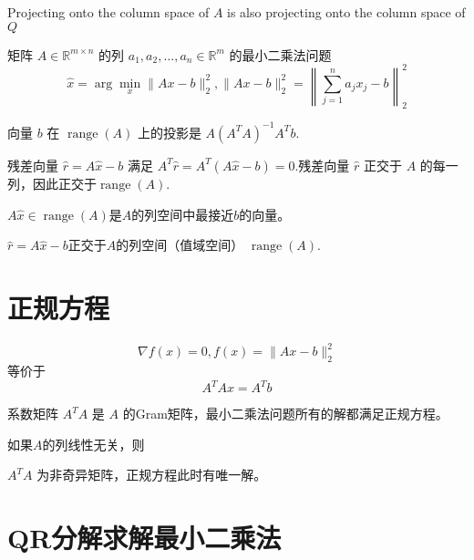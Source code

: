 \begin{FigureCenter}{Projecting onto the column space of $A$ is also projecting onto the column space of $Q$}
    
\end{FigureCenter}

矩阵 $ {A} \in \mathbb{R}^{m \times n} $ 的列 $ a_{1}, a_{2}, \ldots, a_{n} \in \mathbb{R}^{m} $ 的最小二乘法问题
\begin{equation}
\hat{x}=\arg \underset{x}{\min}\|A x-b\|_{2}^{2} ,\|A x-b\|_{2}^{2}=\left\|\sum_{j=1}^{n} a_{j} x_{j}-b\right\|_{2}^{2}
\end{equation}

向量 $ b $ 在 $ \operatorname{range}(A) $ 上的投影是 $ A\left(A^{T} A\right)^{-1} A^{T} b $.

残差向量 $ \hat{r}=A \hat{x}-b $ 满足 $ A^{T} \hat{r}=A^{T}(A \hat{x}-b)=0 $.残差向量 $ \hat{r} $ 正交于 $ A $ 的每一列，因此正交于$ \operatorname{range}(A) $.




\begin{theorem}
    $ A \hat{x} \in \operatorname{range}(A) $是$A$的列空间中最接近$b$的向量。 
    
    $ \hat{r}=A \hat{x} -b$正交于$A$的列空间（值域空间） $ \operatorname{range}(A) $.
\end{theorem}

\section{正规方程}

\begin{theorem}[最小二乘法问题的正规方程]

    \begin{equation} \nabla f(x)=0, f(x)=\|A x-b\|_{2}^{2} \end{equation}
等价于
\begin{equation}
A^{T} A x=A^{T} b
\end{equation}
\end{theorem}

系数矩阵 $ A^{T} A $ 是 $ A $ 的Gram矩阵，最小二乘法问题所有的解都满足正规方程。

\begin{theorem}
    如果$A$的列线性无关，则

    $ A^{T} A $ 为非奇异矩阵，正规方程此时有唯一解。
\end{theorem}


\section{QR分解求解最小二乘法}

